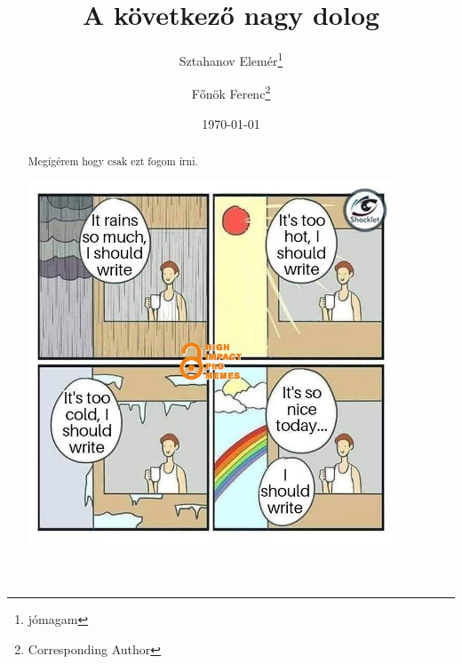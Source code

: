 \documentclass[12pt,a4paper,titlepage,twoside]{article} %
\title{\textbf{A következő nagy dolog}}
\author{Sztahanov Elemér\thanks{jómagam} \and Főnök Ferenc\thanks{Corresponding Author}}
\date{\today}
\numberwithin{equation}{section}
\numberwithin{figure}{section}
\numberwithin{table}{subsection}
\begin{document}
\maketitle

\begin{abstract}
Megígérem hogy csak ezt fogom írni.
\begin{center}	%
	\includegraphics[width=0.9\textwidth, angle=5]{figs/71795715_2451578561753126_9033394225919557632_n.jpg}
\end{center}
\end{abstract}
\end{document}
